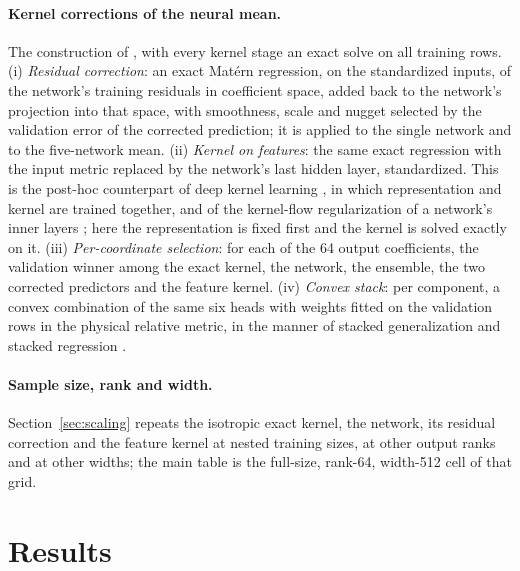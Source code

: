 \documentclass[11pt]{article}
\newcommand{\1}{\mathbf{1}}
\begin{document}
\paragraph{Kernel corrections of the neural mean.} The construction of \cite{nmkc}, with every
kernel stage an exact solve on all training rows. (i) \emph{Residual correction}: an exact
Mat\'ern regression, on the standardized inputs, of the network's training residuals in
coefficient space, added back to the network's projection into that space, with smoothness,
scale and nugget selected by the validation error of the corrected prediction; it is applied
to the single network and to the five-network mean. (ii) \emph{Kernel on features}: the same
exact regression with the input metric replaced by the network's last hidden layer,
standardized. This is the post-hoc counterpart of deep kernel learning \cite{wilson}, in which
representation and kernel are trained together, and of the kernel-flow regularization of a
network's inner layers \cite{yoo}; here the representation is fixed first and the kernel is
solved exactly on it. (iii) \emph{Per-coordinate selection}: for each of the 64 output
coefficients, the validation winner among the exact kernel, the network, the ensemble, the two
corrected predictors and the feature kernel. (iv) \emph{Convex stack}: per component, a convex
combination of the same six heads with weights fitted on the validation rows in the physical
relative metric, in the manner of stacked generalization \cite{wolpert} and stacked regression
\cite{breiman}.

\paragraph{Sample size, rank and width.} Section~\ref{sec:scaling} repeats the isotropic
exact kernel, the network, its residual correction and the feature kernel at nested training
sizes, at other output ranks and at other widths; the main table is the full-size, rank-64,
width-512 cell of that grid.

\section{Results}\label{sec:results}

\begin{table}[t]
\centering\small
\resizebox{\textwidth}{!}{}
\caption{Test errors under the protocol of Section~\ref{sec:data}, mean $\pm$ sample standard
deviation over ten splits. Component and radiance columns report mean relative $L^2$ error;
radiance is evaluated at $\rho=0.7$. The last column is the median absolute reflectance error
in percentage points, over all bands, deep absorption windows included.
Table~\ref{tab:tails} gives the corresponding 95th percentiles and RMSE.}
\label{tab:results}
\end{table}
\end{document}
